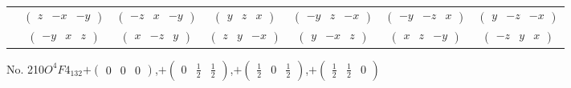 \documentclass[fleqn,9pt,landscape]{jsarticle}
\begin{document}
\begin{center}
\begin{longtable}{ccccccc}
& $ \begin{pmatrix} z & - x & - y \end{pmatrix} $ & $ \begin{pmatrix} - z & x & - y \end{pmatrix} $ & $ \begin{pmatrix} y & z & x \end{pmatrix} $ & $ \begin{pmatrix} - y & z & - x \end{pmatrix} $ & $ \begin{pmatrix} - y & - z & x \end{pmatrix} $ & $ \begin{pmatrix} y & - z & - x \end{pmatrix} $ \\
& $ \begin{pmatrix} - y & x & z \end{pmatrix} $ & $ \begin{pmatrix} x & - z & y \end{pmatrix} $ & $ \begin{pmatrix} z & y & - x \end{pmatrix} $ & $ \begin{pmatrix} y & - x & z \end{pmatrix} $ & $ \begin{pmatrix} x & z & - y \end{pmatrix} $ & $ \begin{pmatrix} - z & y & x \end{pmatrix} $ \\
\end{longtable}
\end{center}
\newpage
No. 210\quad$O_{}^{4}$\quad$F4_132$\quad[ cubic ]\quad$+\begin{pmatrix} 0 & 0 & 0 \end{pmatrix}$,\quad $+\begin{pmatrix} 0 & \frac{1}{2} & \frac{1}{2} \end{pmatrix}$,\quad $+\begin{pmatrix} \frac{1}{2} & 0 & \frac{1}{2} \end{pmatrix}$,\quad $+\begin{pmatrix} \frac{1}{2} & \frac{1}{2} & 0 \end{pmatrix}$
\end{document}
